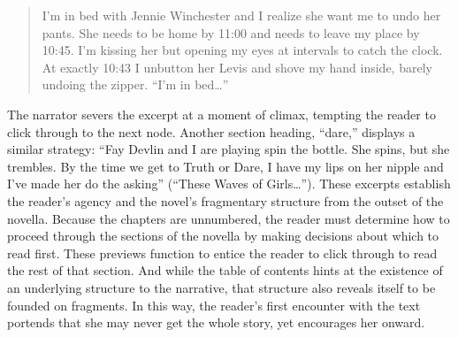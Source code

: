 \documentclass[11pt]{article}
\begin{document}
\begin{quote}
I’m in bed with Jennie Winchester and I realize she want me to undo
her pants. She needs to be home by 11:00 and needs to leave my place
by 10:45. I’m kissing her but opening my eyes at intervals to catch
the clock. At exactly 10:43 I unbutton her Levis and shove my hand
inside, barely undoing the zipper. “I’m in bed\ldots{}”
\end{quote}

The narrator severs the excerpt at a moment of climax, tempting the
reader to click through to the next node. Another section heading,
“dare,” displays a similar strategy: “Fay Devlin and I are playing
spin the bottle. She spins, but she trembles. By the time we get to
Truth or Dare, I have my lips on her nipple and I’ve made her do the
asking” (“These Waves of Girls…”). These excerpts establish the
reader’s agency and the novel’s fragmentary structure from the outset
of the novella. Because the chapters are unnumbered, the reader must
determine how to proceed through the sections of the novella by making
decisions about which to read first. These previews function to entice
the reader to click through to read the rest of that section. And
while the table of contents hints at the existence of an underlying
structure to the narrative, that structure also reveals itself to be
founded on fragments. In this way, the reader’s first encounter with
the text portends that she may never get the whole story, yet
encourages her onward.
\end{document}

